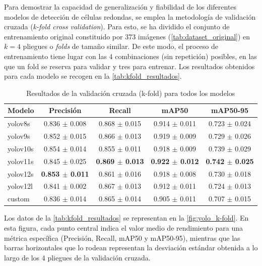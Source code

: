 \documentclass[12pt,a4paper,onecolumn,oneside]{report}
\begin{document}
Para demostrar la capacidad de generalización y fiabilidad de los diferentes modelos de detección de células redondas, se emplea la metodología
de validación cruzada (\textit{k-fold cross validation}). Para esto, se ha dividido el conjunto de entrenamiento original constituido por 373 imágenes (\autoref{tab:dataset_original}) en $k=4$ pliegues o \textit{folds} de tamaño similar.
De este modo, el proceso de entrenamiento tiene lugar con las 4 combinaciones (sin repetición) posibles, en las que un fold se reserva para validar y tres para entrenar. Los resultados obtenidos para cada modelo se recogen en la \autoref{tab:kfold_resultados}.

\begin{table}[htbp]
\caption{Resultados de la validación cruzada (k-fold) para todos los modelos}
\label{tab:kfold_resultados}
\centering
\begin{tabular}{lcccc}
\toprule
\textbf{Modelo} & \textbf{Precisión} & \textbf{Recall} & \textbf{mAP50} & \textbf{mAP50-95} \\
\midrule
yolov8s  & 0.836 $\pm$ 0.008 & 0.868 $\pm$ 0.015 & 0.914 $\pm$ 0.011 & 0.723 $\pm$ 0.024 \\
yolov9s  & 0.852 $\pm$ 0.015 & 0.866 $\pm$ 0.013 & 0.919 $\pm$ 0.009 & 0.729 $\pm$ 0.026 \\
yolov10s & 0.854 $\pm$ 0.014 & 0.855 $\pm$ 0.011 & 0.918 $\pm$ 0.009 & 0.739 $\pm$ 0.029 \\
yolov11s & 0.845 $\pm$ 0.025 & \textbf{0.869 $\pm$ 0.013} & \textbf{0.922 $\pm$ 0.012} & \textbf{0.742 $\pm$ 0.025} \\
yolov12s & \textbf{0.853 $\pm$ 0.011} & 0.861 $\pm$ 0.016 & 0.918 $\pm$ 0.008 & 0.730 $\pm$ 0.018 \\
yolov12l & 0.841 $\pm$ 0.002 & 0.867 $\pm$ 0.013 & 0.912 $\pm$ 0.011 & 0.724 $\pm$ 0.013 \\
custom    & 0.836 $\pm$ 0.014 & 0.865 $\pm$ 0.014 & 0.905 $\pm$ 0.011 & 0.707 $\pm$ 0.015 \\
\bottomrule
\end{tabular}
\end{table}

Los datos de la \autoref{tab:kfold_resultados} se representan en la \autoref{fig:yolo_k-fold}.
En esta figura, cada punto central indica el valor medio de rendimiento para una métrica específica (Precisión, Recall, mAP50 y mAP50-95), 
mientras que las barras horizontales que lo rodean representan la desviación estándar obtenida a lo largo de los 4 pliegues de la validación cruzada.
\end{document}
